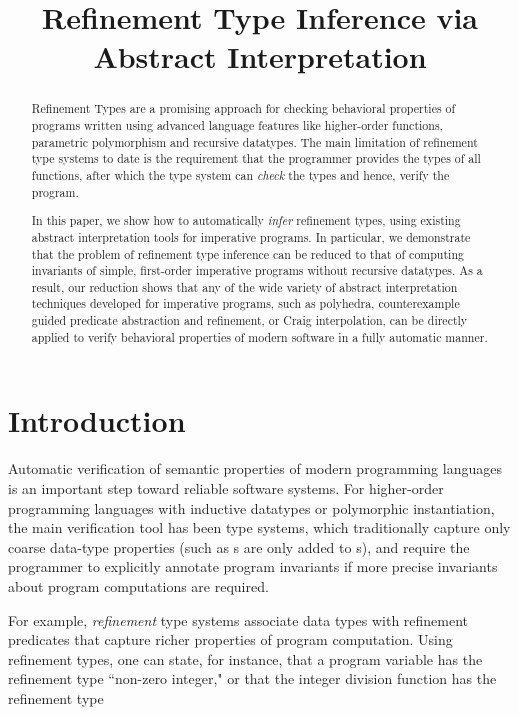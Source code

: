 \documentclass[nocopyrightspace]{sigplanconf}
\begin{document}
\title{Refinement Type Inference via Abstract Interpretation}

\maketitle

\begin{abstract}
Refinement Types are a promising approach for checking behavioral
properties of programs written using advanced language features like
higher-order functions, parametric polymorphism and recursive datatypes.
The main limitation of refinement type systems to date is the  
requirement that the programmer provides the types of all functions, 
after which the type system can {\em check} the types and hence, verify the program.

In this paper, we show how to automatically {\em infer} refinement types, using
existing abstract interpretation tools for imperative programs. 
In particular, we demonstrate that the problem of refinement type 
inference can be reduced to that of computing invariants of simple, 
first-order imperative programs without recursive datatypes.
As a result, our reduction shows that any of the wide variety of 
abstract interpretation techniques developed for imperative programs, 
such as polyhedra, counterexample guided predicate abstraction 
and refinement, or Craig interpolation,
can be directly applied to verify behavioral properties of 
modern software in a fully automatic manner.
\end{abstract}


\section{Introduction}
\label{sec:intro}

Automatic verification of semantic properties of modern programming languages
is an important step toward reliable software systems.
For higher-order programming languages with inductive datatypes
or polymorphic instantiation, the main verification tool has been type systems,
which traditionally capture only coarse data-type properties (such as s are
only added to s),
and require the programmer to explicitly annotate program invariants if
more precise invariants about program computations are required. 

For example, \emph{refinement} type systems \cite{XiPfenning99} 
associate data types with refinement predicates that capture richer properties of
program computation.
Using refinement types, one can state, for instance, that a program variable  has the refinement type
``non-zero integer," or that the integer division function has the refinement type 
 
\end{document}
